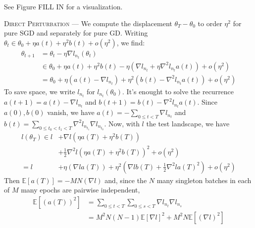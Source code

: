 \documentclass{article}
\newcommand{\expct}[1]{\mathbb{E}\left[#1\right]}
\begin{document}
        See Figure FILL IN for a visualization.

        \textsc{Direct Perturbation} ---
        We compute the displacement $\theta_T-\theta_0$ to order $\eta^2$ 
        for pure SGD and separately for pure GD.  Writing
        $
            \theta_t \in \theta_0 + \eta a(t) + \eta^2 b(t) + o(\eta^2)
        $, we find:
        \begin{align*}
            \theta_{t+1} &=     \theta_t - \eta \nabla l_{n_t} (\theta_t) \\
                         &\in       \theta_0
                                +   \eta a(t) + \eta^2 b(t)
                                -   \eta (
                                            \nabla l_{n_t}
                                        +   \eta \nabla^2 l_{n_t} a(t) 
                                    )
                                +   o(\eta^2) \\
                         &=     \theta_0
                            +   \eta (a(t) - \nabla l_{n_t})
                            +   \eta^2 (b(t) - \nabla^2 l_{n_t} a(t)) 
                            +   o(\eta^2)
        \end{align*}
        To save space, we write $l_{n_t}$ for $l_{n_t}(\theta_0)$.
        It's enought to solve the recurrence $a(t+1) = a(t) - \nabla l_{n_t}$
        and $b(t+1) = b(t) - \nabla^2 l_{n_t} a(t)$.  Since $a(0), b(0)$
        vanish, we have $a(t) =-\sum_{0\leq t<T} \nabla l_{n_t}$ and $b(t) =
        \sum_{0\leq t_0 < t_1 < T} \nabla^2 l_{n_{t_1}} \nabla l_{n_{t_0}}$.
        Now, with $l$ the test landscape, we have
        \begin{align*}
            l(\theta_T) \in    l   &+   \nabla l (\eta a(T) + \eta^2 b(T)) \\
                                   &+   \frac{1}{2} \nabla^2 l (\eta a(T) + \eta^2 b(T))^2
                                    +   o(\eta^2) \\
                        =      l   &+   \eta (\nabla l a(T))
                                    +   \eta^2 (\nabla l b(T) + \frac{1}{2} \nabla^2 l a(T)^2 )
                                    +   o(\eta^2)
        \end{align*}
        Then $\expct{a(T)} = -MN(\nabla l)$ and, since the $N$ many
        singleton batches in each of $M$ many epochs are pairwise independent,
        \begin{align*}
            \expct{(a(T))^2}
            &=
            \sum_{0\leq t<T} \sum_{0\leq s<T} \nabla l_{n_t} \nabla l_{n_s} \\
            &= 
            M^2N(N-1)   \expct{\nabla l}^2 +
            M^2N        \expct{(\nabla l)^2}
        \end{align*}
\end{document}
